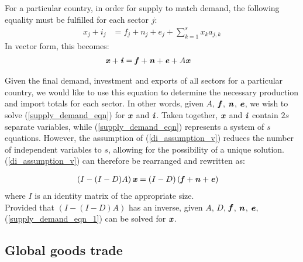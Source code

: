 \documentclass[preprint,authoryear,3p]{elsarticle}
\begin{document}
\noindent For a particular country, in order for supply to match demand, the following equality must be fulfilled for each sector $j$:
\begin{align}
x_j + i_{j} &= f_{j} + n_{j} + e_{j} + \displaystyle \sum_{k=1}^{s} x_k a_{j,k}
\end{align}
In vector form, this becomes:
\begin{align} \label{supply_demand_eqn}
\textbf{\textit{x}} + \textbf{\textit{i}} &= \textbf{\textit{f}} + \textbf{\textit{n}} + \textbf{\textit{e}} + A \textbf{\textit{x}}
\end{align}

\noindent Given the final demand, investment and exports of all sectors for a particular country, we would like to use this equation to determine the necessary production and import totals for each sector. In other words, given $A$, $\textbf{\textit{f}}$, $\textbf{\textit{n}}$, $\textbf{\textit{e}}$, we wish to solve (\ref{supply_demand_eqn}) for $\textbf{\textit{x}}$ and $\textbf{\textit{i}}$. Taken together, $\textbf{\textit{x}}$ and $\textbf{\textit{i}}$ contain $2s$ separate variables, while (\ref{supply_demand_eqn}) represents a system of $s$ equations. However, the assumption of (\ref{di_assumption_v}) reduces the number of independent variables to $s$, allowing for the possibility of a unique solution. \\

\noindent (\ref{di_assumption_v}) can therefore be rearranged and rewritten as:

\begin{align}  \label{supply_demand_eqn_1}
\left( I - (I-D)A \right) \textbf{\textit{x}} &= ( I-D ) \left( \textbf{\textit{f}} + \textbf{\textit{n}} + \textbf{\textit{e}} \right)
\end{align}
where $I$ is an identity matrix of the appropriate size. \\

\noindent Provided that $\left( I - (I-D)A \right)$ has an inverse, given $A$, $D$, $\textbf{\textit{f}}$, $\textbf{\textit{n}}$, $\textbf{\textit{e}}$, (\ref{supply_demand_eqn_1}) can be solved for $\textbf{\textit{x}}$.





\subsection{Global goods trade}  \label{goodstrade}
\end{document}
